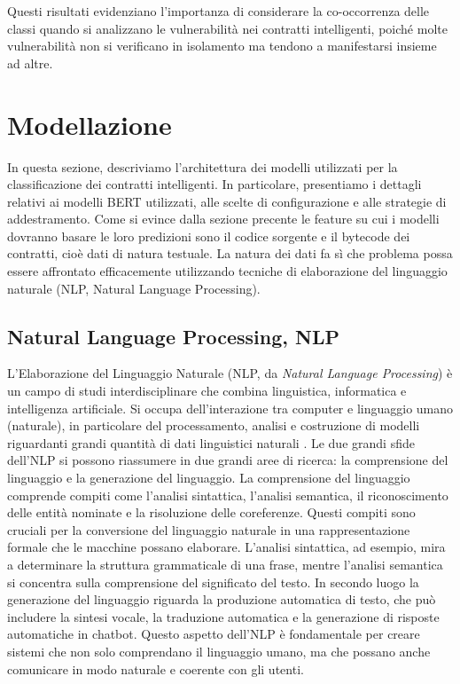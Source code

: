 \documentclass[../../Thesis.tex]{subfiles}
\begin{document}
Questi risultati evidenziano l'importanza di considerare la co-occorrenza delle classi quando si analizzano le vulnerabilità nei contratti intelligenti, poiché molte vulnerabilità non si verificano in isolamento ma tendono a manifestarsi insieme ad altre.


\section{Modellazione}
In questa sezione, descriviamo l'architettura dei modelli utilizzati per la classificazione dei contratti intelligenti. In particolare, presentiamo i dettagli relativi ai modelli BERT utilizzati, alle scelte di configurazione e alle strategie di addestramento.
Come si evince dalla sezione precente le feature su cui i modelli dovranno basare le loro predizioni sono il codice sorgente e il bytecode dei contratti, cioè dati di natura testuale. La natura dei dati fa sì che problema possa essere affrontato efficacemente utilizzando tecniche di elaborazione del linguaggio naturale (NLP, Natural Language Processing).

\subsection{Natural Language Processing, NLP}
L'Elaborazione del Linguaggio Naturale (NLP, da \emph{Natural Language Processing}) è un campo  di studi interdisciplinare che combina linguistica, informatica e intelligenza artificiale. Si occupa dell'interazione tra computer e linguaggio umano (naturale), in particolare del processamento, analisi e costruzione di modelli riguardanti grandi quantità di dati linguistici naturali \cite{jurafsky2009speech}. 
Le due grandi sfide dell'NLP si possono riassumere in due grandi aree di ricerca: la comprensione del linguaggio e la generazione del linguaggio. La comprensione del linguaggio comprende compiti come l'analisi sintattica, l'analisi semantica, il riconoscimento delle entità nominate e la risoluzione delle coreferenze. Questi compiti sono cruciali per la conversione del linguaggio naturale in una rappresentazione formale che le macchine possano elaborare. L'analisi sintattica, ad esempio, mira a determinare la struttura grammaticale di una frase, mentre l'analisi semantica si concentra sulla comprensione del significato del testo. In secondo luogo 
la generazione del linguaggio riguarda la produzione automatica di testo, che può includere la sintesi vocale, la traduzione automatica e la generazione di risposte automatiche in chatbot. Questo aspetto dell'NLP è fondamentale per creare sistemi che non solo comprendano il linguaggio umano, ma che possano anche comunicare in modo naturale e coerente con gli utenti.
\end{document}
